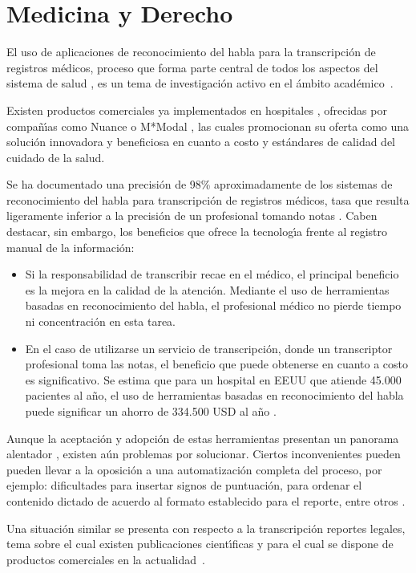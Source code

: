 \section{Medicina y Derecho}
\label{sec:medicina}

El uso de aplicaciones de reconocimiento del habla para la transcripci\'on de registros m\'edicos, proceso 
que forma parte central de todos los aspectos del sistema de salud \cite{DavidListening2009}, 
es un tema de investigaci\'on activo en el \'ambito \mbox{acad\'emico \cite{LaiMedSpeak1997, HappeCombining2002}}.

Existen productos comerciales ya implementados en hospitales \cite{USATodayHospitals}, ofrecidas por compa\~n{\'\i}as 
como Nuance \cite{NuanceOptimizing, NuanceSpeech} o M*Modal \cite{MmodalSpeech}, las cuales promocionan su oferta 
como una soluci\'on innovadora y beneficiosa en cuanto a costo y est\'andares de calidad del cuidado de la salud.

Se ha documentado una precisi\'on de 98\% aproximadamente de los sistemas de reconocimiento del habla para 
transcripci\'on de registros m\'edicos, tasa que resulta ligeramente inferior a la precisi\'on de un 
profesional tomando notas \cite{ZickVoice2001}. Caben destacar, sin embargo, los beneficios que ofrece 
la tecnolog{\'\i}a frente al registro manual de la \mbox{informaci\'on}:

\begin{itemize}
	\item Si la responsabilidad de transcribir recae en el m\'edico, el principal beneficio es la mejora en 
	la calidad de la atenci\'on.
	Mediante el uso de herramientas basadas en reconocimiento del habla, el profesional m\'edico no pierde 
	tiempo ni concentraci\'on en esta tarea.
	\item En el caso de utilizarse un servicio de transcripci\'on, donde un transcriptor profesional toma las notas,
	el beneficio que puede obtenerse en cuanto a costo es significativo. Se estima que para un 
	hospital en EEUU que atiende 45.000 pacientes al a\~no, el uso de herramientas basadas en reconocimiento 
    del habla puede significar un ahorro de 334.500 USD al a\~no \cite{ZickVoice2001}.
\end{itemize}

Aunque la aceptaci\'on y adopci\'on de estas herramientas presentan un panorama alentador \cite{GrassoLong2003}, 
existen a\'un problemas por solucionar. Ciertos inconvenientes pueden pueden llevar a 
la oposici\'on a una automatizaci\'on completa del proceso, por ejemplo: dificultades para insertar 
signos de puntuaci\'on, para ordenar el contenido dictado de acuerdo al formato establecido para el reporte,
entre otros \cite{DavidListening2009}.

Una situaci\'on similar se presenta con respecto a la transcripci\'on reportes legales, 
tema sobre el cual existen publicaciones cient{\'\i}ficas \cite{van-leeuwen2008improving, FalavignaAutomatic2009} 
y para el cual se dispone de productos comerciales en la \mbox{actualidad \cite{NuanceLegal}}.
